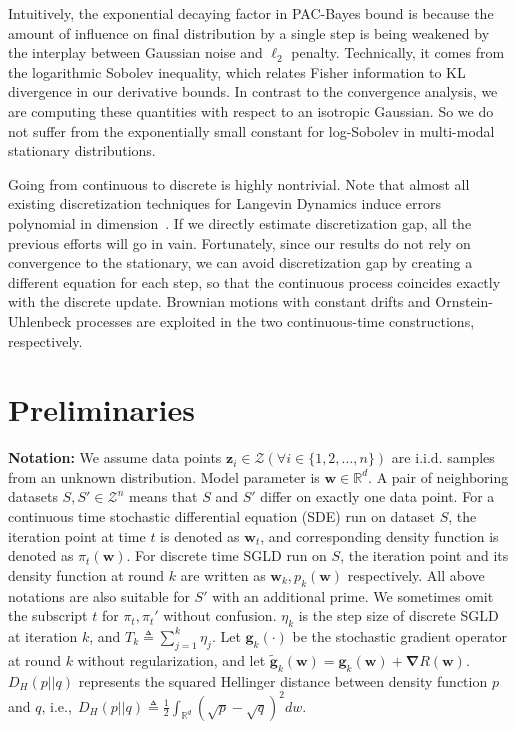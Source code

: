 \documentclass[final,12pt]{colt2018} %
\newcommand{\mc}[1]{\mathcal{#1}}
\newcommand{\z}{\bm{z}}
\newcommand{\w}{\bm{w}}
\begin{document}
Intuitively, the exponential decaying factor in PAC-Bayes bound is because the amount of influence on final distribution by a single step is being weakened by the interplay between Gaussian noise and $\ell_2$ penalty. Technically, it comes from the logarithmic Sobolev inequality, which relates Fisher information to KL divergence in our derivative bounds. In contrast to the convergence analysis, we are computing these quantities with respect to an isotropic Gaussian. So we do not suffer from the exponentially small constant for log-Sobolev in multi-modal stationary distributions.

Going from continuous to discrete is highly nontrivial. Note that almost all existing discretization techniques for Langevin Dynamics induce errors polynomial in dimension~\citep{raginsky2017non,bubeck2015sampling}. If we directly estimate discretization gap, all the previous efforts will go in vain. Fortunately, since our results do not rely on convergence to the stationary, we can avoid discretization gap by creating a different equation for each step, so that the continuous process coincides exactly with the discrete update. Brownian motions with constant drifts and Ornstein-Uhlenbeck processes are exploited in the two continuous-time constructions, respectively.

\section{Preliminaries}
\textbf{Notation:} We assume data points $\z_i \in \mc{Z} (\forall i \in \{1,2,\dots, n\})$ are $\mathrm{i.i.d.}$ samples from an unknown distribution. Model parameter is $\bm{w}\in \mathbb{R}^d$. A pair of neighboring datasets $S, S' \in \mathcal{Z}^n$ means that $S$ and $S'$ differ on exactly one data point. For a continuous time stochastic differential equation (SDE) run on dataset $S$, the iteration point at time $t$ is denoted as $\w_t$, and corresponding density function is denoted as $\pi_t(\w)$. For discrete time SGLD run on $S$, the iteration point and its density function at round $k$ are written as $\w_k, p_k(\w)$ respectively. All above notations are also suitable for $S'$ with an additional prime. We sometimes omit the subscript $t$ for $\pi_t,\pi_t'$ without confusion. $\eta_k$ is the step size of discrete SGLD at iteration $k$, and $T_k \triangleq \sum_{j=1}^k \eta_j$. Let $\bm{g}_k(\cdot)$ be the stochastic gradient operator at round $k$ without regularization, and let $\tilde{\bm{g}}_k(\bm{w})=\bm{g}_k(\bm{w})+\bm{\nabla}R(\bm{w})$. $D_H(p||q)$ represents the squared Hellinger distance between density function $p$ and $q$, i.e.,$ ~~ D_H(p||q)\triangleq \frac{1}{2}\int_{\mathbb{R}^d} \left(\sqrt{p}-\sqrt{q}\right)^2dw$. 
\end{document}
